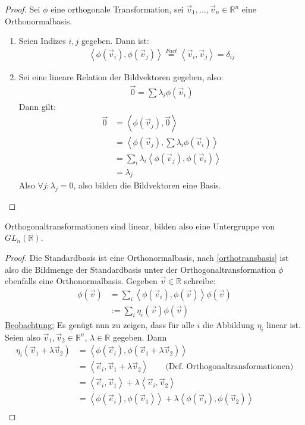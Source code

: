 \documentclass{report}
\newcommand{\ul}[1]{\underline{#1}}
\newcommand{\bR}{\mathbb{R}}
\newcommand{\ve}{\vec{e}}
\newcommand{\vv}{\vec{v}}
\newcommand{\vz}{\vec{0}}
\newcommand{\scalar}[2]{\left\langle #1, #2 \right\rangle}
\begin{document}
\begin{proof}
 Sei $\phi$ eine orthogonale Transformation, sei $\vv_1, \hdots, \vv_n \in \bR^n$ eine Orthonormalbasis.
 \begin{enumerate}
  \item Seien Indizes $i, j$ gegeben. Dann ist:
  \begin{align*}
   \scalar{\phi(\vv_i)}{\phi(\vv_j)} \overset{Fact}{=} \scalar{\vv_i}{\vv_j} = \delta_{ij}
  \end{align*}
  \item Sei eine lineare Relation der Bildvektoren gegeben, also:
  \begin{align*}
   \vz = \sum \lambda_i \phi(\vv_i)
  \end{align*}
  Dann gilt:
  \begin{align*}
   \vz &= \scalar{\phi(\vv_j)}{\vz}\\
       &= \scalar{\phi(\vv_j)}{\sum \lambda_i \phi(\vv_i)}\\
       &= \sum_i \lambda_i \scalar{\phi(\vv_j)}{\phi(\vv_i)}\\
       &= \lambda_j
  \end{align*}
  Also $\forall j : \lambda_j = 0$, also bilden die Bildvektoren eine Basis.
 \end{enumerate}
\end{proof}
\begin{konsequenz}
 Orthogonaltransformationen sind linear, bilden also eine Untergruppe von $GL_n(\bR)$.
\end{konsequenz}
\begin{proof}
 Die Standardbasis ist eine Orthonormalbasis, nach \ref{orthotransbasis} ist also die Bildmenge der Standardbasis unter der Orthogonaltransformation $\phi$ ebenfalls eine Orthonormalbasis. Gegeben $\vv \in \bR$ schreibe:
 \begin{align*}
  \phi(\vv) &= \sum_i \scalar{\phi(\ve_i)}{\phi(\vv)} \phi(\vv)\\
  &:= \sum_i \eta_i(\vv) \phi(\vv)
 \end{align*}
 \ul{Beobachtung:} Es genügt nun zu zeigen, dass für alle $i$ die Abbildung $\eta_i$ linear ist. Seien also $\vv_1, \vv_2 \in \bR^n$, $\lambda \in \bR$ gegeben. Dann
 \begin{align*}
  \eta_i (\vv_1 + \lambda \vv_2) &= \scalar{\phi(\ve_i)}{\phi(\vv_1 + \lambda \vv_2)}\\
  &= \scalar{\ve_i}{\vv_1 + \lambda \vv_2} \qquad\text{(Def. Orthogonaltransformationen)}\\
  &= \scalar{\ve_i}{\vv_1} + \lambda \scalar{\ve_i}{\vv_2}\\
  &= \scalar{\phi(\ve_i)}{\phi(\vv_1)} + \lambda \scalar{\phi(\ve_i)}{\phi(\vv_2)}\\
 \end{align*}
\end{proof}
\end{document}
